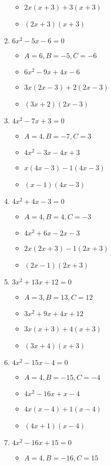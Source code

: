 \documentclass{article}
\begin{document}
\begin{enumerate}
\begin{itemize}
  \item $2x(x+3)+3(x+3)$
  \item $(2x+3)(x+3)$
  \end{itemize}
\item $6x^{2} - 5x - 6 = 0$
  \begin{itemize}
  \item $A=6, B=-5, C=-6$
  \item $6x^{2}-9x+4x-6$
  \item $3x(2x-3)+2(2x-3)$
  \item $(3x+2)(2x-3)$
  \end{itemize}
\item $4x^{2} - 7x + 3 = 0$
  \begin{itemize}
  \item $A=4, B=-7, C=3$
  \item $4x^{2}-3x-4x+3$
  \item $x(4x-3)-1(4x-3)$
  \item $(x-1)(4x-3)$
  \end{itemize}
\item $4x^{2} + 4x - 3 = 0$
  \begin{itemize}
  \item $A=4, B=4, C=-3$
  \item $4x^{2}+6x-2x-3$
  \item $2x(2x+3)-1(2x+3)$
  \item $(2x-1)(2x+3)$
  \end{itemize}
\item $3x^{2} + 13x + 12 = 0$
  \begin{itemize}
  \item $A=3, B=13, C=12$
  \item $3x^{2}+9x+4x+12$
  \item $3x(x+3)+4(x+3)$
  \item $(3x+4)(x+3)$
  \end{itemize}
\item $4x^{2} - 15x - 4 = 0$
  \begin{itemize}
  \item $A=4, B=-15, C=-4$
  \item $4x^{2}-16x+x-4$
  \item $4x(x-4)+1(x-4)$
  \item $(4x+1)(x-4)$
  \end{itemize}
\item $4x^{2} - 16x + 15 = 0$
  \begin{itemize}
  \item $A=4, B=-16, C=15$

\end{itemize}
\end{enumerate}
\end{document}
